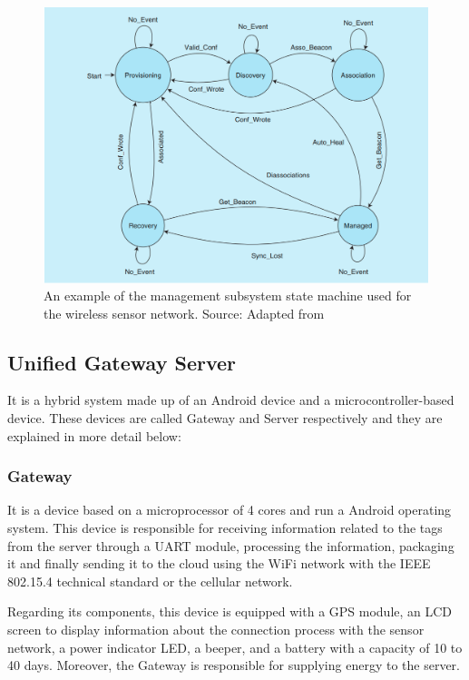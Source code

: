 \documentclass[journal]{IEEEtran}	%
\begin{document}
\begin{figure}[H]
\centering
\includegraphics[width=0.95\columnwidth]{fig6.png}
\caption{An example of the management subsystem state machine used for the wireless sensor network. Source: Adapted from \cite{williams2017weaving}}
\label{fig:state_machine}
\end{figure}

\subsection{Unified Gateway Server}

It is a hybrid system made up of an Android device and a microcontroller-based device. These devices are called Gateway and Server respectively and they are explained in more detail below:\\

\subsubsection{Gateway}
\label{sec:gateway}

It is a device based on a microprocessor of 4 cores and run a Android operating system. This device is responsible for receiving information related to the tags from the server through a UART module, processing the information, packaging it and finally sending it to the cloud using the WiFi network with the IEEE 802.15.4 technical standard or the cellular network.

Regarding its components, this device is equipped with a GPS module, an LCD screen to display information about the connection process with the sensor network, a power indicator LED, a beeper, and a battery with a capacity of 10 to 40 days. Moreover, the Gateway is responsible for supplying energy to the server.
\end{document}
